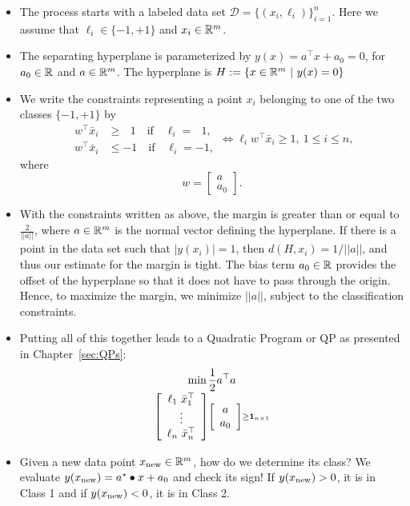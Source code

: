 \begin{tcolorbox}[sharp corners, colback=green!30, colframe=green!80!blue, title=\textbf{\large Highlights of the Max Margin Classifier for Two Classes}]

\begin{itemize}
    \item The process starts with a labeled data set $\mathcal{D} = \{(x_i,\ell_i)\}_{i=1}^n.$ Here we assume that $\ell_i \in \{-1, +1\} $ and $x_i \in \mathbb R^m$.
    \item The separating hyperplane is parameterized by $y(x)= a^\top x + a_0 = 0$, for $a_0\in \mathbb R$ and $a \in \mathbb R^m$. The hyperplane is $H:=\{x\in \mathbb R^m~|~ y(x) = 0\}$

    \item We write the constraints representing a point $x_i$ belonging to one of the two classes $\{-1, +1\}$ by $$\begin{aligned}
     w^\top \bar{x}_i &\geq ~~~1 \quad \text{if} \quad \ell_i = ~~~1,\\
     w^\top \bar{x}_i &\leq -1 \quad \text{if} \quad \ell_i = -1,
\end{aligned}  \iff \ell_i w^\top \bar{x}_i \ge 1, ~1 \le i \le n,$$ 
where $$ w = \left[ \begin{array}{c}a \\ a_0 \end{array} \right].$$

\item With the constraints written as above, the margin is greater than or equal to $\frac{2}{||a||}$, where $a\in \mathbb R^m$ is the normal vector defining the hyperplane. If there is a point in the data set such that $|y(x_i)|=1$, then $d(H,x_i) = 1/||a||$, and thus our estimate for the margin is tight. The bias term $a_0 \in \mathbb R$ provides the offset of the hyperplane so that it does not have to pass through the origin. Hence, to maximize the margin, we minimize $||a||$, subject to the classification constraints.

\item Putting all of this together leads to a Quadratic Program or QP as presented in Chapter~\ref{sec:QPs}:
   $$ \underset{\left[\begin{array}{c}  \ell_1 ~\bar{x}_1^\top \\ \vdots \\  \ell_n ~\bar{x}_n^\top \end{array} \right] \left[\begin{array}{c} a \\ a_0 \end{array} \right]  \geq {\bf \large 1}_{n \times 1}} { \min \frac{1}{2} a^\top a } 
        $$   

 \item Given a new data point $x_{\rm new} \in \mathbb R^m$, how do we determine its class? We evaluate $y(x_{\rm new} ) = a^\ast \bullet x + a_0$ and check its sign! If $y(x_{\rm new} )>0$, it is in Class 1 and if $y(x_{\rm new} )<0$, it is in Class 2.        
\end{itemize}

    
\end{tcolorbox}


